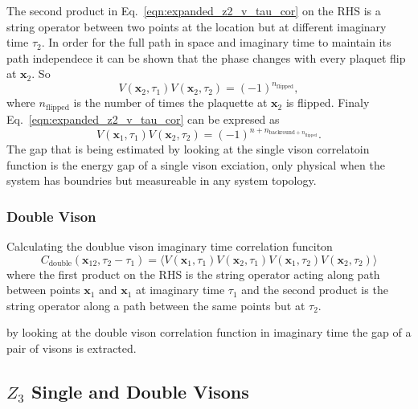 \documentclass[twocolumn,prb,aps,floatfix,superscriptaddress]{revtex4-1}
\begin{document}
            The second product in Eq.~\ref{eqn:expanded_z2_v_tau_cor} on the RHS is a string operator 
            between two points at the location but at different imaginary time $\tau_2$. 
            In order for the full path in space and
            imaginary time to maintain its path independece it can be shown that the phase 
            changes with every plaquet flip at $\bm{x}_2$. So
            \begin{equation}
                V(\bm{x}_2,\tau_1) V(\bm{x}_2,\tau_2) = (-1)^{n_{\mathrm{flipped}}},
            \end{equation}
            where $n_{\mathrm{flipped}}$ is the number of times the plaquette at $\bm{x}_2$ is flipped.
            Finaly Eq.~\ref{eqn:expanded_z2_v_tau_cor} can be expresed as 
            \begin{equation}
                V(\bm{x}_1,\tau_1) V(\bm{x}_2,\tau_2) =
                (-1)^{n+n_{\mathrm{backround}+n_{\mathrm{flipped}}}}.
            \end{equation}
            The gap that is being estimated by looking at the single vison correlatoin function is
            the energy gap of a single vison exciation, only physical when the system has
            boundries but measureable in any system topology. 

        \subsubsection{Double Vison}
            Calculating the doublue vison imaginary time correlation funciton
            \begin{equation}
                C_{\mathrm{double}}(\bm{x}_{12},\tau_2 - \tau_1) = \langle V(\bm{x}_1,\tau_1)V(\bm{x}_2,\tau_1) V(\bm{x}_1,\tau_2)V(\bm{x}_2,\tau_2) \rangle
            \end{equation}
            where the first product on the RHS is the string operator acting along path between points
            $\bm{x}_1$ and $\bm{x}_1$ at imaginary time $\tau_1$ and the second product is the
            string operator along a path between the same points but at $\tau_2$. 

            by looking at the double vison correlation function in imaginary time the gap of a pair
            of visons is extracted.
    
    \subsection{$Z_3$ Single and Double Visons}



\end{document}
